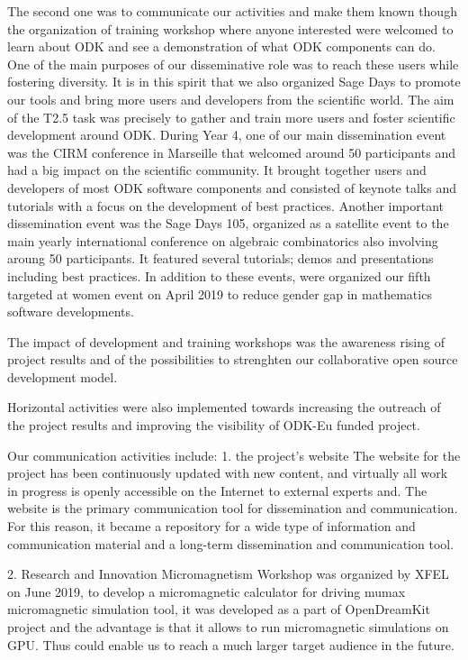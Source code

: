 The second one was to communicate our activities and make them known though the organization of training workshop where anyone interested were welcomed to learn about ODK and see a demonstration of what ODK components can do. One of the main purposes of our disseminative role was to reach these users while fostering diversity. It is in this spirit that we also organized Sage Days to  promote our tools and bring more users and developers from the scientific world. The aim of the T2.5 task was precisely to gather and train more users and foster scientific development around ODK. During Year 4,  one of our main dissemination event was the CIRM conference in Marseille  that welcomed around 50 participants and had a big impact on the scientific community. It brought together users and developers of most ODK software components and consisted of keynote talks and tutorials with a focus on the development of best practices. 
Another important dissemination event was the Sage Days 105, organized as a satellite event to the main yearly international conference  on algebraic combinatorics also involving aroung 50 participants. It featured several tutorials; demos and presentations including best practices. In addition to these events, were organized  our fifth targeted at women event on April 2019 to reduce gender gap in mathematics software developments.  

The impact of development and training workshops was the awareness rising of project results and of the possibilities to strenghten our collaborative open source development model.

Horizontal  activities  were also  implemented  towards  increasing  the  outreach  of  the project  results  and  improving  the  visibility  of  ODK-Eu funded project.

Our communication activities include:
1.	the project’s website
The website for the project has been continuously updated with new content, and virtually all work in progress is openly accessible on the Internet to external experts and.  The   website   is   the   primary   communication   tool   for   dissemination   and communication.  For  this  reason,  it  became  a  repository  for  a  wide  type  of information and communication material and a long-term dissemination and communication tool.

2. Research and Innovation
Micromagnetism Workshop was organized by XFEL on June 2019, to develop a micromagnetic calculator for driving mumax  micromagnetic simulation tool, it was developed as a part of OpenDreamKit project and the advantage is that it allows to run micromagnetic simulations on GPU. Thus could enable us to reach a much larger target audience in the future.

